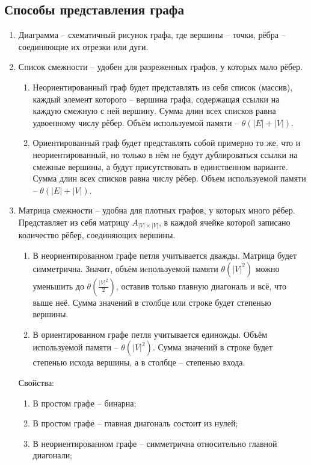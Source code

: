 \documentclass[a4paper,12pt]{article}
\begin{document}
\subsection*{Способы представления графа}

\begin{enumerate}
    \item Диаграмма -- схематичный рисунок графа, где вершины -- точки, рёбра -- соединяющие их отрезки или дуги.
    \item Список смежности -- удобен для разреженных графов, у которых мало рёбер.
    \begin{enumerate}
        \item Неориентированный граф будет представлять из себя список (массив), каждый элемент которого -- вершина графа, содержащая ссылки на каждую смежную с ней вершину. Сумма длин всех списков равна удвоенному числу рёбер. Объём используемой памяти -- $\theta(|E| + |V|)$.
        \item Ориентированный граф будет представлять собой примерно то же, что и неориентированный, но только в нём не будут дублироваться ссылки на смежные вершины, а будут присутствовать в единственном варианте. Сумма длин всех списков равна числу рёбер. Объем используемой памяти -- $\theta(|E| + |V|)$.
    \end{enumerate}
    \item Матрица смежности -- удобна для плотных графов, у которых много рёбер. Представляет из себя матрицу $A_{|V| \times |V|}$, в каждой ячейке которой записано количество рёбер, соединяющих вершины.
    \begin{enumerate}
        \item В неориентированном графе петля учитывается дважды. Матрица будет симметрична. Значит, объём иcпользуемой памяти $\theta(|V|^2)$ можно уменьшить до $\theta\left(\frac{|V|^2}{2}\right)$, оставив только главную диагональ и всё, что выше неё. Сумма значений в столбце или строке будет степенью вершины.
        \item В ориентированном графе петля учитывается единожды. Объём используемой памяти -- $\theta(|V|^2)$. Сумма значений в строке будет степенью исхода вершины, а в столбце -- степенью входа.
    \end{enumerate}
    Свойства:
    \begin{enumerate}
        \item В простом графе -- бинарна;
        \item В простом графе -- главная диагональ состоит из нулей;
        \item В неориентированном графе -- симметрична относительно главной диагонали;

\end{enumerate}
\end{enumerate}
\end{document}
